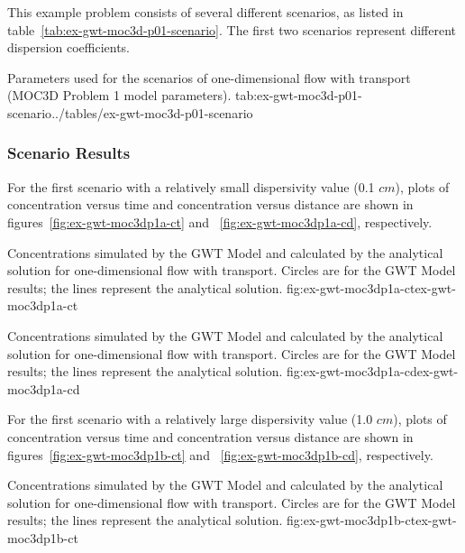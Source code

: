 This example problem consists of several different scenarios, as listed in table~\ref{tab:ex-gwt-moc3d-p01-scenario}.  The first two scenarios represent different dispersion coefficients.

\begin{ScenarioTable}{
                                   Parameters used for the scenarios of one-dimensional flow with transport (MOC3D Problem 1 model parameters).
                                   }{tab:ex-gwt-moc3d-p01-scenario}{../tables/ex-gwt-moc3d-p01-scenario}
\end{ScenarioTable}

\subsubsection{Scenario Results}

For the first scenario with a relatively small dispersivity value (0.1 $cm$), plots of concentration versus time and concentration versus distance are shown in figures~\ref{fig:ex-gwt-moc3dp1a-ct} and ~\ref{fig:ex-gwt-moc3dp1a-cd}, respectively.

\begin{StandardFigure}{
                                     Concentrations simulated by the \mf GWT Model and calculated by the analytical solution for one-dimensional flow with transport.  Circles are for the GWT Model results; the lines represent the analytical solution.
                                     }{fig:ex-gwt-moc3dp1a-ct}{ex-gwt-moc3dp1a-ct}
\end{StandardFigure}            

\begin{StandardFigure}{
                                     Concentrations simulated by the \mf GWT Model and calculated by the analytical solution for one-dimensional flow with transport.  Circles are for the GWT Model results; the lines represent the analytical solution.
                                     }{fig:ex-gwt-moc3dp1a-cd}{ex-gwt-moc3dp1a-cd}
\end{StandardFigure}            

For the first scenario with a relatively large dispersivity value (1.0 $cm$), plots of concentration versus time and concentration versus distance are shown in figures~\ref{fig:ex-gwt-moc3dp1b-ct} and ~\ref{fig:ex-gwt-moc3dp1b-cd}, respectively.

\begin{StandardFigure}{
                                     Concentrations simulated by the \mf GWT Model and calculated by the analytical solution for one-dimensional flow with transport.  Circles are for the GWT Model results; the lines represent the analytical solution.
                                     }{fig:ex-gwt-moc3dp1b-ct}{ex-gwt-moc3dp1b-ct}
\end{StandardFigure}            

